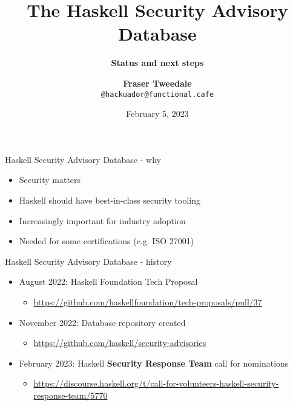 \documentclass[ignorenonframetext,aspectratio=169,12pt]{beamer}
\title{\bf The Haskell Security Advisory Database}
\subtitle{\bf Status and next steps}
\author{{\bf Fraser Tweedale}\\
    \texttt{@hackuador@functional.cafe}}
\date{February 5, 2023}
\begin{document}
\frame{\titlepage}

\begin{frame}{Haskell Security Advisory Database - why}

\begin{itemize}
    \item Security matters
    \item Haskell should have best-in-class security tooling
    \item Increasingly important for industry adoption
    \item Needed for some certifications (e.g. ISO 27001)
\end{itemize}

\end{frame}

\begin{frame}{Haskell Security Advisory Database - history}

\begin{itemize}
    \item August 2022: Haskell Foundation Tech Proposal
        \begin{itemize}
            \item \url{https://github.com/haskellfoundation/tech-proposals/pull/37}
        \end{itemize}
    \item November 2022: Database repository created
        \begin{itemize}
            \item \url{https://github.com/haskell/security-advisories}
        \end{itemize}
    \item February 2023: Haskell {\bf Security Response Team} call for nominations
        \begin{itemize}
            \item \url{https://discourse.haskell.org/t/call-for-volunteers-haskell-security-response-team/5770}
        \end{itemize}
\end{itemize}

\end{frame}
\end{document}
